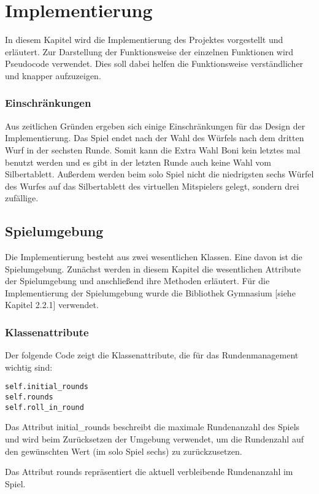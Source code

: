 \section{Implementierung}
In diesem Kapitel wird die Implementierung des Projektes vorgestellt und erläutert. Zur Darstellung der Funktionsweise der einzelnen Funktionen wird Pseudocode verwendet. Dies soll dabei helfen die Funktionsweise verständlicher und knapper aufzuzeigen.
\subsubsection{Einschränkungen}
Aus zeitlichen Gründen ergeben sich einige Einschränkungen für das Design der Implementierung. Das Spiel endet nach der Wahl des Würfels nach dem dritten Wurf in der sechsten Runde. Somit kann die Extra Wahl Boni kein letztes mal benutzt werden und es gibt in der letzten Runde auch keine Wahl vom Silbertablett. Außerdem werden beim solo Spiel nicht die niedrigsten sechs Würfel des Wurfes auf das Silbertablett des virtuellen Mitspielers gelegt, sondern drei zufällige.
\subsection{Spielumgebung}
Die Implementierung besteht aus zwei wesentlichen Klassen. Eine davon ist die Spielumgebung. Zunächst werden in diesem Kapitel die wesentlichen Attribute der Spielumgebung und anschließend ihre Methoden erläutert. Für die Implementierung der Spielumgebung wurde die Bibliothek Gymnasium [siehe Kapitel 2.2.1] verwendet.
\subsubsection{Klassenattribute}
\begin{minipage}{\linewidth}
Der folgende Code zeigt die Klassenattribute, die für das Rundenmanagement wichtig sind:
\vspace{0.5cm}
\begin{lstlisting}[caption={Klassenattribute für Runden}]
self.initial_rounds
self.rounds
self.roll_in_round
\end{lstlisting}
\end{minipage}

Das Attribut initial\_rounds beschreibt die maximale Rundenanzahl des Spiels und wird beim Zurücksetzen der Umgebung verwendet, um die Rundenzahl auf den gewünschten Wert (im solo Spiel sechs) zu zurückzusetzen.

Das Attribut rounds repräsentiert die aktuell verbleibende Rundenanzahl im Spiel.


